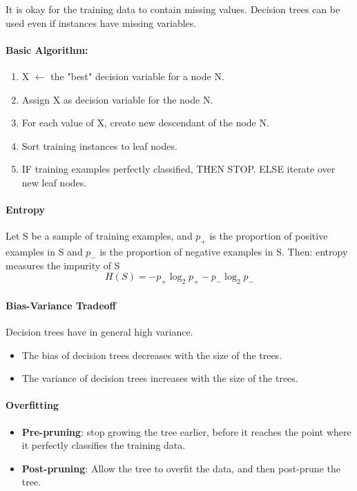 It is okay for the training data to contain missing values. Decision trees can be used even if instances have missing variables.

\paragraph{Basic Algorithm:}
\begin{enumerate}[noitemsep]
    \item X $\leftarrow$ the "best" decision variable for a node N.
    \item Assign X as decision variable for the node N.
    \item For each value of X, create new descendant of the node N.
    \item Sort training instances to leaf nodes.
    \item IF training examples perfectly classified, THEN STOP. ELSE iterate over new leaf nodes.
\end{enumerate}

\paragraph{Entropy}
Let S be a sample of training examples, and $p_+$ is the proportion of positive examples in S and $p_-$ is the proportion of negative examples in S. Then: entropy measures the impurity of S
$$H(S) = -p_+ \log_2 p_+ - p_- \log_2 p_-$$

\paragraph{Bias-Variance Tradeoff}
Decision trees have in general high variance.
\begin{itemize}[noitemsep]
    \item The bias of decision trees decreases with the size of the trees.
    \item The variance of decision trees increases with the size of the trees.
\end{itemize}

\paragraph{Overfitting}
\begin{itemize}[noitemsep]
    \item \textbf{Pre-pruning}: stop growing the tree earlier, before it reaches the point where it perfectly classifies the training data.
    \item \textbf{Post-pruning}: Allow the tree to overfit the data, and then post-prune the tree.
\end{itemize}

